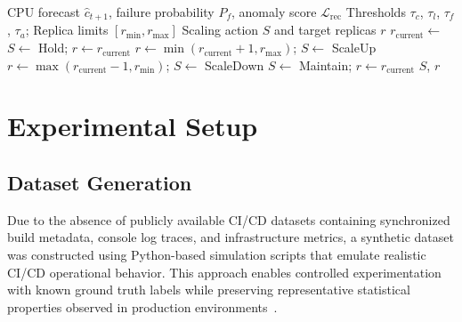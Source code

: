 \documentclass[sn-nature]{sn-jnl}
\theoremstyle{thmstyleone}
\theoremstyle{thmstyletwo}
\theoremstyle{thmstylethree}
\begin{document}
\begin{algorithm}[htbp]
\caption{Predictive Autoscaling Decision Algorithm}\label{algo:autoscale}
\begin{algorithmic}[1]
\Require CPU forecast $\hat{c}_{t+1}$, failure probability $P_f$, anomaly score $\mathcal{L}_{\mathrm{rec}}$
\Require Thresholds $\tau_c$, $\tau_l$, $\tau_f$, $\tau_a$;
Replica limits $[r_{\mathrm{min}}, r_{\mathrm{max}}]$
\Ensure Scaling action $S$ and target replicas $r$
\State $r_{\mathrm{current}} \gets$ 
    \State {}
\EndIf
{}
    \State $S \gets$ \textrm{Hold};
$r \gets r_{\mathrm{current}}$
    \State $r \gets \min(r_{\mathrm{current}} + 1, r_{\mathrm{max}})$;
$S \gets$ \textrm{ScaleUp}
    \State $r \gets \max(r_{\mathrm{current}} - 1, r_{\mathrm{min}})$;
$S \gets$ \textrm{ScaleDown}
\Else
    \State $S \gets$ \textrm{Maintain};
$r \gets r_{\mathrm{current}}$
\EndIf
\State {}
\State \Return $S$, $r$
\end{algorithmic}
\end{algorithm}

\section{Experimental Setup}\label{sec:experimental}

\subsection{Dataset Generation}\label{subsec:dataset}

Due to the absence of publicly available CI/CD datasets containing synchronized build metadata, console log traces, and infrastructure metrics, a synthetic dataset was constructed using Python-based simulation scripts that emulate realistic CI/CD operational behavior.
This approach enables controlled experimentation with known ground truth labels while preserving representative statistical properties observed in production environments~\cite{rausch2017empirical, beller2017oops}.
\end{document}
